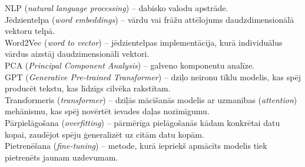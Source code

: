NLP (\textit{natural language processing}) -- dabisko valodu apstrāde.\\
Jēdzientelpa (\textit{word embeddings}) -- vārdu vai frāžu attēlojums daudzdimensionālā vektoru telpā.\\
Word2Vec (\textit{word to vector}) -- jēdzientelpas implementācija, kurā individuālus vārdus aizstāj daudzimensionāli vektori.\\
PCA (\textit{Principal Component Analysis}) -- galveno komponentu analīze.\\
GPT (\textit{Generative Pre-trained Transformer}) – dziļo neironu tīklu modelis, kas spēj producēt tekstu, kas līdzīgs cilvēka rakstītam.\\
Transformeris (\textit{transformer}) -- dziļās mācīšanās modelis ar uzmanības (\textit{attention})  mehānismu, kas spēj novērtēt ievades daļas nozīmīgumu.\\
Pārpielāgošana (\textit{overfitting}) -- pārmērīga pielāgošanās kādam konkrētai datu kopai, zaudējot spēju ģeneralizēt uz citām datu kopām.\\
Pietrenēšana (\textit{fine-tuning}) -- metode, kurā iepriekš apmācīts modelis tiek pietrenēts jaunam uzdevumam.\\
